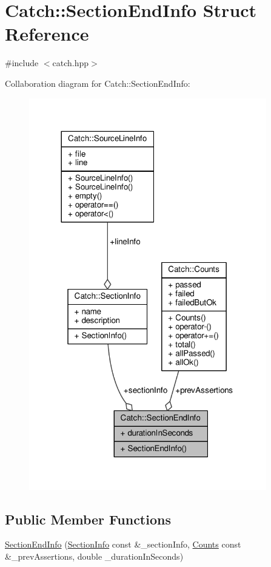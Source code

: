 \hypertarget{struct_catch_1_1_section_end_info}{\section{Catch\-:\-:Section\-End\-Info Struct Reference}
\label{struct_catch_1_1_section_end_info}
}


{\ttfamily \#include $<$catch.\-hpp$>$}



Collaboration diagram for Catch\-:\-:Section\-End\-Info\-:
\nopagebreak
\begin{figure}[H]
\begin{center}
\leavevmode
\includegraphics[width=293pt]{struct_catch_1_1_section_end_info__coll__graph}
\end{center}
\end{figure}
\subsection*{Public Member Functions}
\begin{DoxyCompactItemize}
\item 
\hyperlink{struct_catch_1_1_section_end_info_abc9381c7c22b6907317ec985ccaa6713}{Section\-End\-Info} (\hyperlink{struct_catch_1_1_section_info}{Section\-Info} const \&\-\_\-section\-Info, \hyperlink{struct_catch_1_1_counts}{Counts} const \&\-\_\-prev\-Assertions, double \-\_\-duration\-In\-Seconds)
\end{DoxyCompactItemize}
